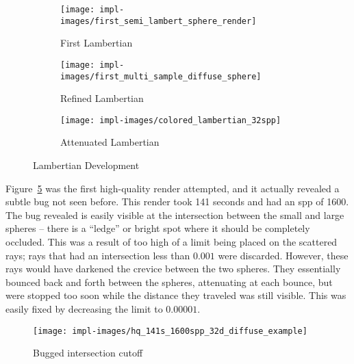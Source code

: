 \vspace{0.3em}
\begin{figure}[htb]
  \centering
  \begin{subfigure}[htb]{0.3\textwidth}
    \texttt{[image: impl-images/first\_semi\_lambert\_sphere\_render]}
    \caption{First Lambertian}
    \label{fig:rayterm-cpu_lambert}
  \end{subfigure}
  \begin{subfigure}[htb]{0.3\textwidth}
    \texttt{[image: impl-images/first\_multi\_sample\_diffuse\_sphere]}
    \caption{Refined Lambertian}
    \label{fig:rayterm-cpu_lambert_refined}
  \end{subfigure}
  \begin{subfigure}[htb]{0.3\textwidth}
    \texttt{[image: impl-images/colored\_lambertian\_32spp]}
    \caption{Attenuated Lambertian}
    \label{fig:rayterm-cpu_lambert_colored}
  \end{subfigure}
  \caption{Lambertian Development}
  \label{fig:rayterm-cpu_lambert_development}
\end{figure}

Figure~\ref{fig:rayterm-cpu_intersection_bug} was the first high-quality render attempted, and it actually revealed a subtle bug not seen before.
This render took 141 seconds and had an spp of 1600.
The bug revealed is easily visible at the intersection between the small and large spheres -- there is a ``ledge'' or bright spot where it should be completely occluded.
This was a result of too high of a limit being placed on the scattered rays; rays that had an intersection less than $0.001$ were discarded.
However, these rays would have darkened the crevice between the two spheres.
They essentially bounced back and forth between the spheres, attenuating at each bounce, but were stopped too soon while the distance they traveled was still visible.
This was easily fixed by decreasing the limit to $0.00001$.

\vspace{0.3em}
\begin{figure}[htb]
  \centering
  \texttt{[image: impl-images/hq\_141s\_1600spp\_32d\_diffuse\_example]}
  \caption{Bugged intersection cutoff}
  \label{fig:rayterm-cpu_intersection_bug}
\end{figure}

